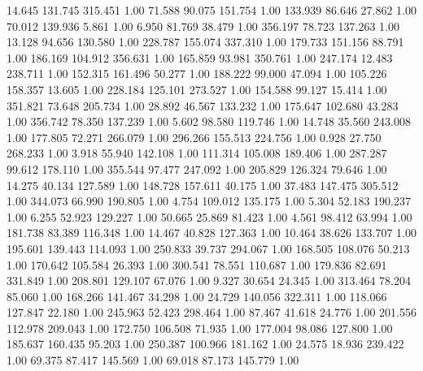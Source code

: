   14.645  131.745  315.451         1.00
  71.588   90.075  151.754         1.00
 133.939   86.646   27.862         1.00
  70.012  139.936    5.861         1.00
   6.950   81.769   38.479         1.00
 356.197   78.723  137.263         1.00
  13.128   94.656  130.580         1.00
 228.787  155.074  337.310         1.00
 179.733  151.156   88.791         1.00
 186.169  104.912  356.631         1.00
 165.859   93.981  350.761         1.00
 247.174   12.483  238.711         1.00
 152.315  161.496   50.277         1.00
 188.222   99.000   47.094         1.00
 105.226  158.357   13.605         1.00
 228.184  125.101  273.527         1.00
 154.588   99.127   15.414         1.00
 351.821   73.648  205.734         1.00
  28.892   46.567  133.232         1.00
 175.647  102.680   43.283         1.00
 356.742   78.350  137.239         1.00
   5.602   98.580  119.746         1.00
  14.748   35.560  243.008         1.00
 177.805   72.271  266.079         1.00
 296.266  155.513  224.756         1.00
   0.928   27.750  268.233         1.00
   3.918   55.940  142.108         1.00
 111.314  105.008  189.406         1.00
 287.287   99.612  178.110         1.00
 355.544   97.477  247.092         1.00
 205.829  126.324   79.646         1.00
  14.275   40.134  127.589         1.00
 148.728  157.611   40.175         1.00
  37.483  147.475  305.512         1.00
 344.073   66.990  190.805         1.00
   4.754  109.012  135.175         1.00
   5.304   52.183  190.237         1.00
   6.255   52.923  129.227         1.00
  50.665   25.869   81.423         1.00
   4.561   98.412   63.994         1.00
 181.738   83.389  116.348         1.00
  14.467   40.828  127.363         1.00
  10.464   38.626  133.707         1.00
 195.601  139.443  114.093         1.00
 250.833   39.737  294.067         1.00
 168.505  108.076   50.213         1.00
 170.642  105.584   26.393         1.00
 300.541   78.551  110.687         1.00
 179.836   82.691  331.849         1.00
 208.801  129.107   67.076         1.00
   9.327   30.654   24.345         1.00
 313.464   78.204   85.060         1.00
 168.266  141.467   34.298         1.00
  24.729  140.056  322.311         1.00
 118.066  127.847   22.180         1.00
 245.963   52.423  298.464         1.00
  87.467   41.618   24.776         1.00
 201.556  112.978  209.043         1.00
 172.750  106.508   71.935         1.00
 177.004   98.086  127.800         1.00
 185.637  160.435   95.203         1.00
 250.387  100.966  181.162         1.00
  24.575   18.936  239.422         1.00
  69.375   87.417  145.569         1.00
  69.018   87.173  145.779         1.00
